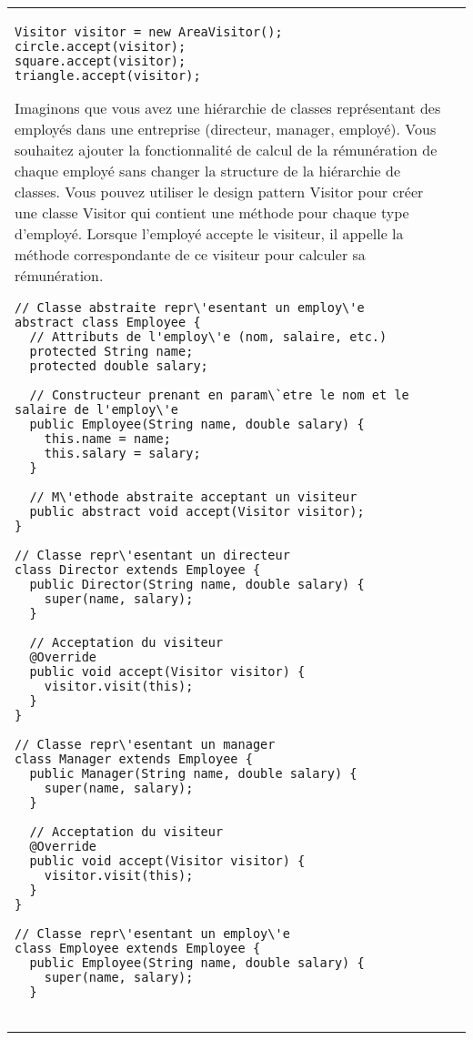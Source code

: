 \begin{minipage}[t]{1\textwidth}
\begin{table}[H]
\begin{adjustbox}{max width=\textwidth}
\begin{tabular}{l|p{\textwidth}}
\begin{minipage}[tl]{0.5\textwidth}
\begin{lstlisting}[style=monstyle]
Visitor visitor = new AreaVisitor();
circle.accept(visitor);
square.accept(visitor);
triangle.accept(visitor);
\end{lstlisting}
\end{minipage}
\hspace{6mm}
\begin{minipage}[tr]{0.5\textwidth}
Imaginons que vous avez une hiérarchie de classes représentant des employés dans une entreprise (directeur, manager, employé). Vous souhaitez ajouter la fonctionnalité de calcul de la rémunération de chaque employé sans changer la structure de la hiérarchie de classes. Vous pouvez utiliser le design pattern Visitor pour créer une classe Visitor qui contient une méthode pour chaque type d'employé. Lorsque l'employé accepte le visiteur, il appelle la méthode correspondante de ce visiteur pour calculer sa rémunération.  
\begin{lstlisting}[style=monstyle]
// Classe abstraite repr\'esentant un employ\'e
abstract class Employee {
  // Attributs de l'employ\'e (nom, salaire, etc.)
  protected String name;
  protected double salary;

  // Constructeur prenant en param\`etre le nom et le salaire de l'employ\'e
  public Employee(String name, double salary) {
    this.name = name;
    this.salary = salary;
  }

  // M\'ethode abstraite acceptant un visiteur
  public abstract void accept(Visitor visitor);
}

// Classe repr\'esentant un directeur
class Director extends Employee {
  public Director(String name, double salary) {
    super(name, salary);
  }

  // Acceptation du visiteur
  @Override
  public void accept(Visitor visitor) {
    visitor.visit(this);
  }
}

// Classe repr\'esentant un manager
class Manager extends Employee {
  public Manager(String name, double salary) {
    super(name, salary);
  }

  // Acceptation du visiteur
  @Override
  public void accept(Visitor visitor) {
    visitor.visit(this);
  }
}

// Classe repr\'esentant un employ\'e
class Employee extends Employee {
  public Employee(String name, double salary) {
    super(name, salary);
  }


\end{lstlisting}
\end{minipage}
\end{tabular}
\end{adjustbox}
\end{table}
\end{minipage}

